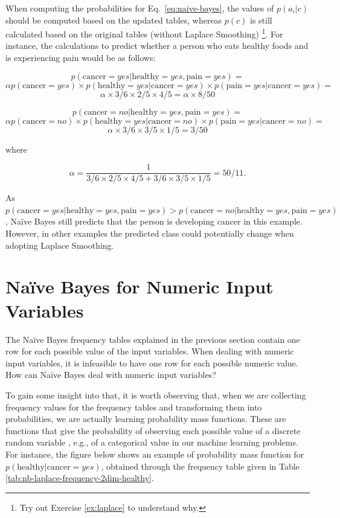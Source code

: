When computing the probabilities for Eq.~\ref{eq:naive-bayes}, the values of $p(a_i|c)$ should be computed based on the updated tables, whereas $p(c)$ is still calculated based on the original tables (without Laplace Smoothing) \footnote{Try out Exercise \ref{ex:laplace} to understand why.}.  For instance, the calculations to predict whether a person who eats healthy foods and is experiencing pain would be as follows:

\[p(\text{cancer} = \textit{yes}| \text{healthy} = \textit{yes}, \text{pain} = \textit{yes}) = \]
\[\alpha p(\text{cancer} = \textit{yes}) \times p(\text{healthy} = yes | \text{cancer} = \textit{yes}) \times p(\text{pain} = yes | \text{cancer} = \textit{yes}) = \]
\[ \alpha \times 3/6 \times 2/5 \times 4/5 = \alpha \times 8/50\]

\vspace{0.5cm}
\[p(\text{cancer} = \textit{no}| \text{healthy} = \textit{yes}, \text{pain} = \textit{yes}) = \]
\[\alpha p(\text{cancer} = \textit{no}) \times p(\text{healthy} = \textit{yes} | \text{cancer} = \textit{no}) \times p(\text{pain} = \textit{yes} | \text{cancer} = \textit{no}) = \]
\[ \alpha \times 3/6 \times 3/5 \times 1/5 = 3/50\]

\noindent where 

\[\alpha = \frac{1}{3/6 \times 2/5 \times 4/5 + 3/6 \times 3/5 \times 1/5} = 50/11 .\]

\vspace{0.5cm}
As $p(\text{cancer} = \textit{yes}| \text{healthy} = \textit{yes}, \text{pain} = \textit{yes})  > p(\text{cancer} = \textit{no}| \text{healthy} = \textit{yes}, \text{pain} = \textit{yes})$, Na\"{i}ve Bayes still predicts that the person is developing cancer in this example. However, in other examples the predicted class could potentially change when adopting Laplace Smoothing.

\section{Na\"{i}ve Bayes for Numeric Input Variables}
\label{sec:nb-numeric}

The Na\"{i}ve Bayes frequency tables explained in the previous section contain one row for each possible value of the input variables. When dealing with numeric input variables, it is infeasible to have one row for each possible numeric value. How can Na\"{i}ve Bayes deal with numeric input variables?

To gain some insight into that, it is worth observing that, when we are collecting frequency values for the frequency tables and transforming them into probabilities, we are actually learning probability mass functions. These are functions that give the probability of observing each possible value of a discrete random variable \cite{RussellNorvig,MathsForML}, e.g., of a categorical value in our machine learning problems. For instance, the figure below shows an example of probability mass function for $p(\text{healthy}|\text{cancer} = \textit{yes})$, obtained through the frequency table given in Table \ref{tab:nb-laplace-frequency-2dim-healthy}.

